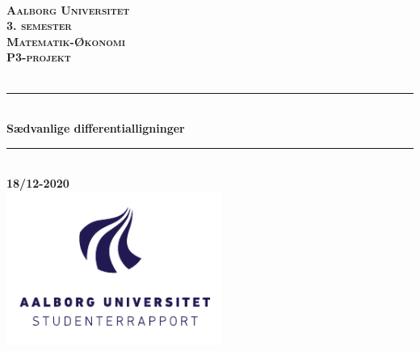%
\begin{titlepage}

\thispagestyle{empty}

\newcommand{\HRule}{\rule{\linewidth}{0.5mm}}

\center

\textsc{}\\[2.5cm]
    
\textsc{\textbf{\LARGE Aalborg Universitet}}\\[1.5cm]

\textsc{\textbf{\Large 3. semester}}\\[0.5cm]

\textsc{\textbf{\large Matematik-Økonomi}}\\[0.5cm]

\textsc{\textbf{\large P3-projekt}}\\[0.5cm]

\textsc{\textbf{\large }}\\[0.5cm]

\HRule \\[0.4cm]

{\huge \bfseries Sædvanlige differentialligninger}\\[0.4cm]

\HRule\\[1.5cm]

\textbf{\large 18/12-2020}\\[1cm]

\includegraphics[height=5cm]{Formalia/AAU-logo-stud-DK-RGB.pdf}

\vfill

\end{titlepage}
\pagebreak
\thispagestyle{empty}
\phantom{a}
\clearpage